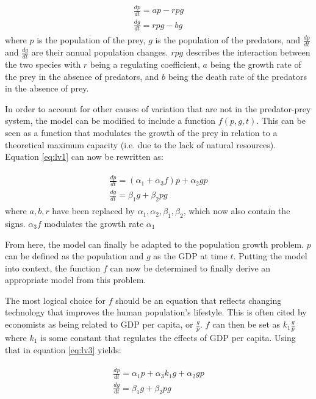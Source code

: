 \documentclass[a4paper]{article}
\begin{document}
\begin{align}
\begin{split}
\label{eq:lv1}
	\frac{dp}{dt} = ap - rpg \\
	\frac{dg}{dt} = rpg - bg
\end{split}
\end{align}
where $p$ is the population of the prey, $g$ is the population of the predators, and $\frac{dp}{dt}$ and $\frac{dg}{dt}$ are their annual population changes. $rpg$ describes the interaction between the two species with $r$ being a regulating coefficient, $a$ being the growth rate of the prey in the absence of predators, and $b$ being the death rate of the predators in the absence of prey. 

In order to account for other causes of variation that are not in the predator-prey system, the model can be modified to include a function $f(p, g, t)$. This can be seen as a function that modulates the growth of the prey in relation to a theoretical maximum capacity (i.e. due to the lack of natural resources). Equation \ref{eq:lv1} can now be rewritten as:

\begin{align}
\begin{split}
\label{eq:lv3}
	\frac{dp}{dt} = (\alpha_1 + \alpha_3 f)p + \alpha_2 g p \\
	\frac{dg}{dt} = \beta_1 g + \beta_2 p g
\end{split}
\end{align}
where $a, b, r$ have been replaced by $\alpha_1, \alpha_2, \beta_1, \beta_2$, which now also contain the signs. $\alpha_3f$ modulates the growth rate $\alpha_1$

From here, the model can finally be adapted to the population growth problem. $p$ can be defined as the population and $g$ as the GDP at time $t$. Putting the model into context, the function $f$ can now be determined to finally derive an appropriate model from this problem.

The most logical choice for $f$ should be an equation that reflects changing technology that improves the human population's lifestyle. This is often cited by economists as being related to GDP per capita, or $\frac{g}{p}$. $f$ can then be set as $k_1 \frac{g}{p}$ where $k_1$ is some constant that regulates the effects of GDP per capita. Using that in equation \ref{eq:lv3} yields:

\begin{align}
\begin{split}
\label{eq:lvfin}
	\frac{dp}{dt} = \alpha_1 p + \alpha_3 k_1 g + \alpha_2 g p \\
	\frac{dg}{dt} = \beta_1 g + \beta_2 p g
\end{split}
\end{align}
\end{document}
